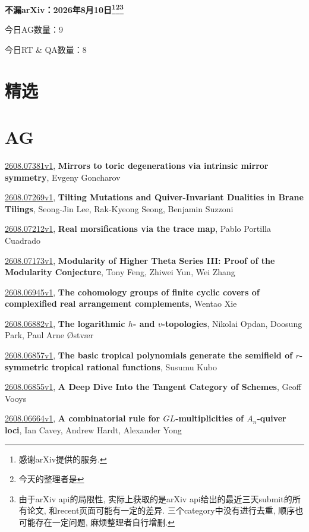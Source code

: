 \documentclass[9pt, a4paper]{article}
\theoremstyle{plain}
\theoremstyle{definition}
\theoremstyle{remark}
\newcommand{\arxiv}[3]{\href{https://arxiv.org/abs/#1}{#1}, \textbf{\textcolor{arxivblue}{#2}}, #3}
\newcommand{\AGnumber}{9}
\newcommand{\RTQAnumber}{8}
\newcommand{\NewestDate}{2026年8月10日}
\newcommand{\todayarXiver}{} %
\begin{document}
\begin{center}
    \Huge\textbf{不漏arXiv：\NewestDate\footnote{感谢arXiv提供的服务.}\footnote{今天的整理者是\todayarXiver}\footnote{由于arXiv api的局限性, 实际上获取的是arXiv api给出的最近三天submit的所有论文, 和recent页面可能有一定的差异. 三个category中没有进行去重, 顺序也可能存在一定问题, 麻烦整理者自行增删.}} \\
\end{center}

\setcounter{section}{-1}

\begin{center}
    今日AG数量：\AGnumber
    
    今日RT \& QA数量：\RTQAnumber
    
\end{center}


\section{精选}


\section{AG}
\arxiv{2608.07381v1}{Mirrors to toric degenerations via intrinsic mirror symmetry}{Evgeny Goncharov}

\arxiv{2608.07269v1}{Tilting Mutations and Quiver-Invariant Dualities in Brane Tilings}{Seong-Jin Lee, Rak-Kyeong Seong, Benjamin Suzzoni}

\arxiv{2608.07212v1}{Real morsifications via the trace map}{Pablo Portilla Cuadrado}

\arxiv{2608.07173v1}{Modularity of Higher Theta Series III: Proof of the Modularity Conjecture}{Tony Feng, Zhiwei Yun, Wei Zhang}

\arxiv{2608.06945v1}{The cohomology groups of finite cyclic covers of complexified real arrangement complements}{Wentao Xie}

\arxiv{2608.06882v1}{The logarithmic $h$- and $v$-topologies}{Nikolai Opdan, Doosung Park, Paul Arne Østvær}

\arxiv{2608.06857v1}{The basic tropical polynomials generate the semifield of $r$-symmetric tropical rational functions}{Susumu Kubo}

\arxiv{2608.06855v1}{A Deep Dive Into the Tangent Category of Schemes}{Geoff Vooys}

\arxiv{2608.06664v1}{A combinatorial rule for $GL$-multiplicities of $A_n$-quiver loci}{Ian Cavey, Andrew Hardt, Alexander Yong}
\end{document}

